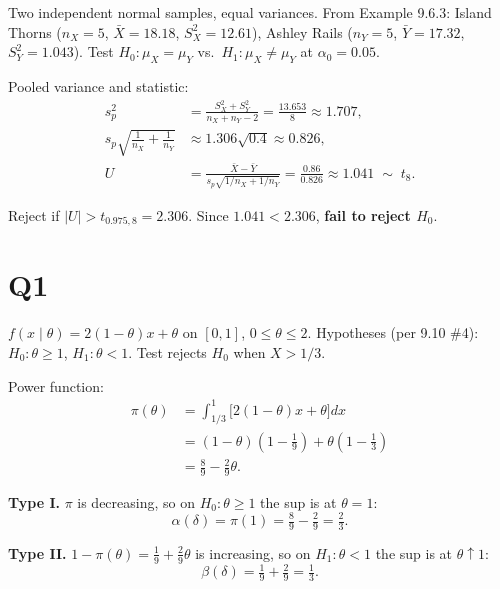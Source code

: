 \documentclass[11pt]{article}
\begin{document}
Two independent normal samples, equal variances. From Example 9.6.3:
Island Thorns ($n_X = 5$, $\bar{X} = 18.18$, $S_X^2 = 12.61$),
Ashley Rails ($n_Y = 5$, $\bar{Y} = 17.32$, $S_Y^2 = 1.043$).
Test $H_0\!: \mu_X = \mu_Y$ vs.\ $H_1\!: \mu_X \neq \mu_Y$ at $\alpha_0 = 0.05$.

Pooled variance and statistic:
\begin{align*}
    s_p^2 &= \tfrac{S_X^2 + S_Y^2}{n_X + n_Y - 2}
          = \tfrac{13.653}{8} \approx 1.707, \\
    s_p\sqrt{\tfrac{1}{n_X}+\tfrac{1}{n_Y}}
          &\approx 1.306\sqrt{0.4} \approx 0.826, \\
    U &= \tfrac{\bar{X}-\bar{Y}}{s_p\sqrt{1/n_X + 1/n_Y}}
       = \tfrac{0.86}{0.826} \approx 1.041 \;\sim\; t_8.
\end{align*}

Reject if $|U| > t_{0.975,8} = 2.306$. Since $1.041 < 2.306$, \textbf{fail to reject $H_0$}.

\bigskip
\bigskip

\section*{Q1}

$f(x\mid\theta) = 2(1-\theta)x + \theta$ on $[0,1]$, $0 \le \theta \le 2$.
Hypotheses (per 9.10 \#4): $H_0\!: \theta \ge 1$, $H_1\!: \theta < 1$.
Test rejects $H_0$ when $X > 1/3$.

Power function:
\begin{align*}
    \pi(\theta) &= \int_{1/3}^{1}\!\bigl[2(1-\theta)x + \theta\bigr]dx \\
                &= (1-\theta)\!\left(1 - \tfrac{1}{9}\right) + \theta\!\left(1 - \tfrac{1}{3}\right) \\
                &= \tfrac{8}{9} - \tfrac{2}{9}\theta.
\end{align*}

\textbf{Type I.} $\pi$ is decreasing, so on $H_0\!: \theta \ge 1$ the sup is at $\theta = 1$:
\[
    \alpha(\delta) = \pi(1) = \tfrac{8}{9} - \tfrac{2}{9} = \tfrac{2}{3}.
\]

\textbf{Type II.} $1 - \pi(\theta) = \tfrac{1}{9} + \tfrac{2}{9}\theta$ is increasing, so on $H_1\!: \theta < 1$ the sup is at $\theta \uparrow 1$:
\[
    \beta(\delta) = \tfrac{1}{9} + \tfrac{2}{9} = \tfrac{1}{3}.
\]
\end{document}
